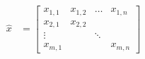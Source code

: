 \begin{align}
    \hat{x} &= \begin{bmatrix}
x_{1,1} & x_{1,2} & \hdots & x_{1,n} \\
x_{2,1} & x_{2,2} \\
\vdots  &         & \ddots &     \\
x_{m,1} &         &        & x_{m,n}
               \end{bmatrix}
\end{align}